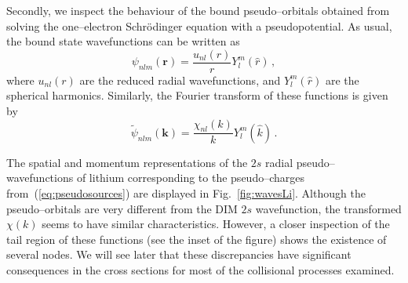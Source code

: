 \documentclass[10pt]{article}
\begin{document}
Secondly, we inspect the behaviour of the bound pseudo--orbitals 
obtained from solving the one--electron Schr\"odinger equation with a 
pseudopotential. As usual, the bound state wavefunctions can be 
written as
\begin{equation}
 \psi_{nlm}(\mathbf{r}) = \frac{u_{nl}(r)}{r}Y_l^m(\hat{r})\,,
 \label{eq:centralfield-wave}
\end{equation}
where $u_{nl}(r)$ are the reduced radial wavefunctions, and 
$Y_l^m(\hat{r})$ are the spherical harmonics. Similarly, the Fourier 
transform of these functions is given by
\begin{equation}
 \widetilde{\psi}_{nlm}(\mathbf{k}) =
 \frac{\chi_{nl}(k)}{k}Y_l^m(\hat{k})\,.
\end{equation}

The spatial and momentum representations of the $2s$ radial 
pseudo--wavefunctions of lithium corresponding to the pseudo--charges 
from~(\ref{eq:pseudosources}) are displayed in Fig.~\ref{fig:wavesLi}.
Although the pseudo--orbitals are very different from the DIM $2s$ 
wavefunction, the transformed $\chi(k)$ seems to have similar 
characteristics. However, a closer inspection of the tail region of 
these functions (see the inset of the figure) shows the existence of 
several nodes. We will see later that these discrepancies have 
significant consequences in the cross sections for most of the 
collisional processes examined.
\end{document}
